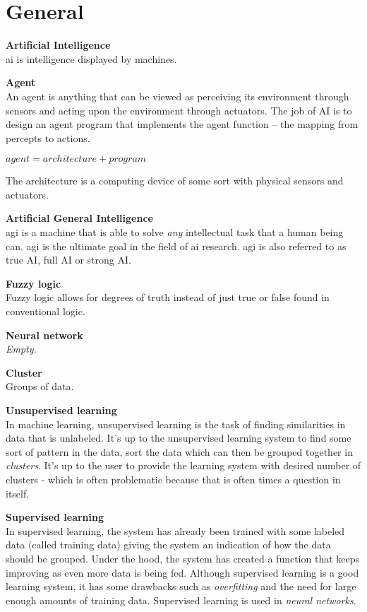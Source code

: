 \section{General}

\textbf{Artificial Intelligence} \\
\acrfull{ai} is intelligence displayed by machines. 

\textbf{Agent} \\
An agent is anything that can be viewed as perceiving its environment through sensors and acting upon the environment through actuators. The job of AI is to design an agent program that implements the agent function – the mapping from percepts to actions. \\
\centerline{$agent = architecture + program$}
The architecture is a computing device of some sort with physical sensors and actuators. 

\textbf{Artificial General Intelligence} \\
\acrfull{agi} is a machine that is able to solve \textit{any} intellectual task that a human being can. \acrshort{agi} is the ultimate goal in the field of \acrshort{ai} research. \acrshort{agi} is also referred to as true AI, full AI or strong AI. 

\textbf{Fuzzy logic} \\
Fuzzy logic allows for degrees of truth instead of just true or false found in conventional logic.

\textbf{Neural network} \\
\textit{Empty.}

\textbf{Cluster} \\
Groups of data.

\textbf{Unsupervised learning} \\
In machine learning, unsupervised learning is the task of finding similarities in data that is unlabeled. It's up to the unsupervised learning system to find some sort of pattern in the data, sort the data which can then be grouped together in \textit{clusters}. It's up to the user to provide the learning system with desired number of clusters - which is often problematic because that is often times a question in itself. 


\textbf{Supervised learning} \\
In supervised learning, the system has already been trained with some labeled data (called training data) giving the system an indication of how the data should be grouped. Under the hood, the system has created a function that keeps improving as even more data is being fed. Although supervised learning is a good learning system, it has some drawbacks such as \textit{overfitting} and the need for large enough amounts of training data. Supervised learning is used in \textit{neural networks}. 


